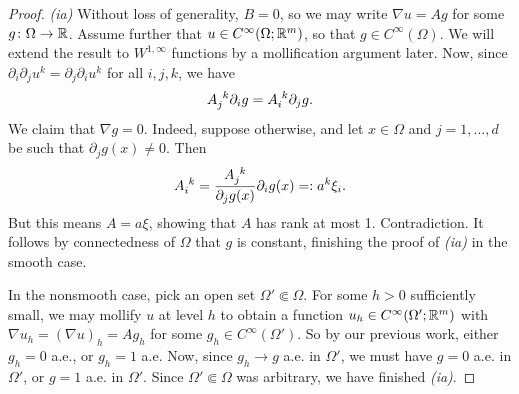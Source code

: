 \begin{proof}
    \textit{(ia)} Without loss of generality, $B = 0$, so we may write $\nabla u = A g$ for some $g \colon \Omega \to \mathbb{R}$. Assume further that $u \in C^\infty(\Omega;\mathbb{R}^m)$, so that $g \in C^\infty(\Omega)$. We will extend the result to $W^{1,\infty}$ functions by a mollification argument later. Now, since $\partial_i \partial_j u^k = \partial_j \partial_i u^k$ for all $i,j,k$, we have 
    \begin{equation}
        \tensor{A}{_j^k} \partial_i g = \tensor{A}{_i^k} \partial_j g.
    \end{equation}
    We claim that $\nabla g = 0$. Indeed, suppose otherwise, and let $x \in \Omega$ and $j = 1,\dots,d$ be such that $\partial_j g(x) \neq 0$. Then 
    \begin{equation}
        \tensor{A}{_i^k} = \frac{\tensor{A}{_j^k}}{\partial_j g(x)} \partial_i g(x) =: a^k \xi_i.
    \end{equation}
    But this means $A = a \xi$, showing that $A$ has rank at most 1. Contradiction. It follows by connectedness of $\Omega$ that $g$ is constant, finishing the proof of \textit{(ia)} in the smooth case.

    In the nonsmooth case, pick an open set $\Omega' \Subset \Omega$. For some $h > 0$ sufficiently small, we may mollify $u$ at level $h$ to obtain a function $u_h \in C^\infty(\Omega';\mathbb{R}^m)$ with $\nabla u_h = (\nabla u)_h = A g_h$ for some $g_h \in C^\infty(\Omega')$. So by our previous work, either $g_h = 0$ a.e., or $g_h = 1$ a.e. Now, since $g_h \to g$ a.e. in $\Omega'$, we must have $g = 0$ a.e. in $\Omega'$, or $g = 1$ a.e. in $\Omega'$. Since $\Omega' \Subset \Omega$ was arbitrary, we have finished \textit{(ia)}.


\end{proof}
